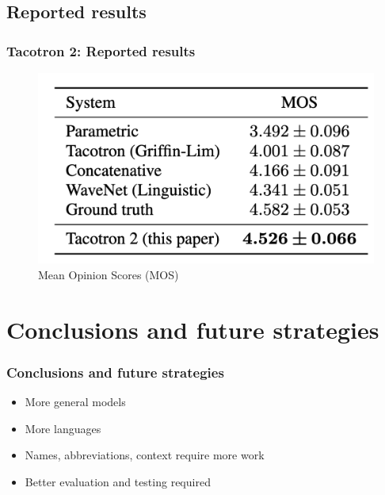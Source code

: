 \documentclass{beamer}
\begin{document}
  \subsection{Reported results}
  \begin{frame}
    \frametitle{Tacotron 2: Reported results}
    \begin{figure}
      \includegraphics[scale=0.3]{images/tacotron_results.png}
      \caption{Mean Opinion Scores (MOS)}
    \end{figure}
  \end{frame}

  \section{Conclusions and future strategies}
  \begin{frame}
    \frametitle{Conclusions and future strategies}
    \begin{itemize}
      \item More general models
      \item More languages
      \item Names, abbreviations, context require more work
      \item Better evaluation and testing required
    \end{itemize}
  \end{frame}
\end{document}
